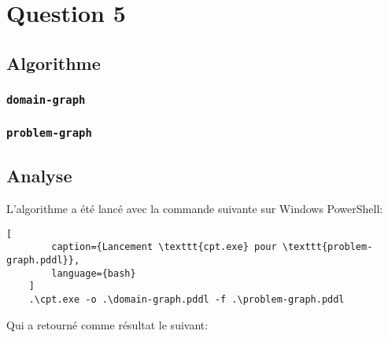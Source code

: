 \documentclass[../CSC_5RO16_TA_TP5.tex]{subfiles}
\begin{document}
\section{Question 5}
% 

\subsection{Algorithme}

\subsubsection{\texttt{domain-graph}}

\begin{scriptsize}\mycode
    
\end{scriptsize}

\subsubsection{\texttt{problem-graph}}

\begin{scriptsize}\mycode
    
\end{scriptsize}

\subsection{Analyse}
\noindent L'algorithme a été lancé avec la commande suivante sur Windows PowerShell:

\begin{scriptsize}\mycode
	\begin{lstlisting}[
        caption={Lancement \texttt{cpt.exe} pour \texttt{problem-graph.pddl}},
        language={bash}
    ]
    .\cpt.exe -o .\domain-graph.pddl -f .\problem-graph.pddl
    \end{lstlisting}
\end{scriptsize}

\noindent Qui a retourné comme résultat le suivant:
\end{document}
